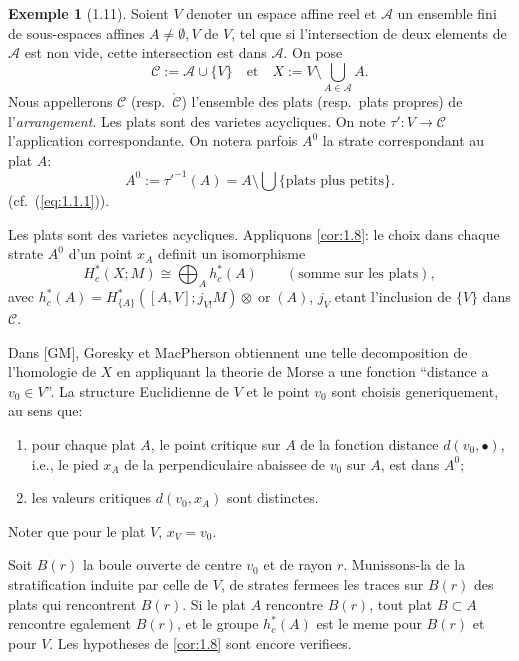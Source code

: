 \documentclass[11pt,a4paper]{article}
\theoremstyle{plain}
\theoremstyle{definition}
\newtheorem{example}[theorem]{Exemple}
\newcommand{\ori}{\operatorname{or}}
\begin{document}
\begin{example}[1.11]\label{ex:1.11}
Soient $V$ denoter un espace affine reel et $\mathcal{A}$ un ensemble fini de sous-espaces affines $A \neq \emptyset, V$ de $V$, tel que si l'intersection de deux elements de $\mathcal{A}$ est non vide, cette intersection est dans $\mathcal{A}$. On pose
\[\mathcal{C} := \mathcal{A} \cup \{V\} \quad \text{et} \quad X := V \setminus \bigcup_{A \in \mathcal{A}} A.\]
Nous appellerons $\mathcal{C}$ (resp.~$\mathring{\mathcal{C}}$) l'ensemble des plats (resp.~plats propres) de l'\emph{arrangement}. Les plats sont des varietes acycliques. On note $\tau': V \to \mathcal{C}$ l'application correspondante. On notera parfois $A^0$ la strate correspondant au plat $A$:
\begin{equation}\label{eq:1.11.1}
A^0 := \tau'^{-1}(A) = A \setminus \bigcup\{\text{plats plus petits}\}.
\tag{1.11.1}
\end{equation}
(cf.~(\ref{eq:1.1.1})).

Les plats sont des varietes acycliques. Appliquons \ref{cor:1.8}: le choix dans chaque strate $A^0$ d'un point $x_A$ definit un isomorphisme
\begin{equation}\label{eq:1.11.2}
H^*_c(X;M) \cong \bigoplus_A h^*_c(A) \qquad (\text{somme sur les plats}),
\tag{1.11.2}
\end{equation}
avec $h^*_c(A) = H^*_{\{A\}}([A,V];j_{V!}M) \otimes \ori(A)$, $j_V$ etant l'inclusion de $\{V\}$ dans $\mathcal{C}$.

Dans [GM], Goresky et MacPherson obtiennent une telle decomposition de l'homologie de $X$ en appliquant la theorie de Morse a une fonction ``distance a $v_0 \in V$''. La structure Euclidienne de $V$ et le point $v_0$ sont choisis generiquement, au sens que:
\begin{enumerate}[label=(\alph*)]
\item pour chaque plat $A$, le point critique sur $A$ de la fonction distance $d(v_0,\bullet)$, i.e., le pied $x_A$ de la perpendiculaire abaissee de $v_0$ sur $A$, est dans $A^0$;
\item les valeurs critiques $d(v_0,x_A)$ sont distinctes.
\end{enumerate}
Noter que pour le plat $V$, $x_V = v_0$.

Soit $B(r)$ la boule ouverte de centre $v_0$ et de rayon $r$. Munissons-la de la stratification induite par celle de $V$, de strates fermees les traces sur $B(r)$ des plats qui rencontrent $B(r)$. Si le plat $A$ rencontre $B(r)$, tout plat $B \subset A$ rencontre egalement $B(r)$, et le groupe $h^*_c(A)$ est le meme pour $B(r)$ et pour $V$. Les hypotheses de \ref{cor:1.8} sont encore verifiees.


\end{example}
\end{document}
